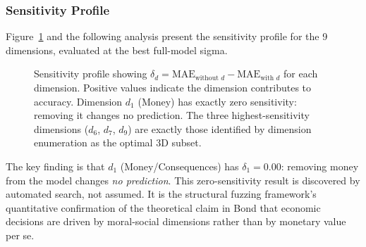 \documentclass[12pt]{article}
\newcommand{\MAE}{\mathrm{MAE}}
\begin{document}
\subsubsection{Sensitivity Profile}

Figure~\ref{fig:sensitivity} and the following analysis present the sensitivity profile for the 9 dimensions, evaluated at the best full-model sigma.

\begin{figure}[H]
\centering
{}
\caption{Sensitivity profile showing $\delta_d = \MAE_{\text{without } d} - \MAE_{\text{with } d}$ for each dimension.  Positive values indicate the dimension contributes to accuracy.  Dimension $d_1$ (Money) has exactly zero sensitivity: removing it changes no prediction.  The three highest-sensitivity dimensions ($d_6$, $d_7$, $d_9$) are exactly those identified by dimension enumeration as the optimal 3D subset.}
\label{fig:sensitivity}
\end{figure}

The key finding is that $d_1$ (Money/Consequences) has $\delta_1 = 0.00$: removing money from the model changes \emph{no prediction}.  This zero-sensitivity result is discovered by automated search, not assumed.  It is the structural fuzzing framework's quantitative confirmation of the theoretical claim in Bond \cite{bond2026gecon} that economic decisions are driven by moral-social dimensions rather than by monetary value per se.
\end{document}
